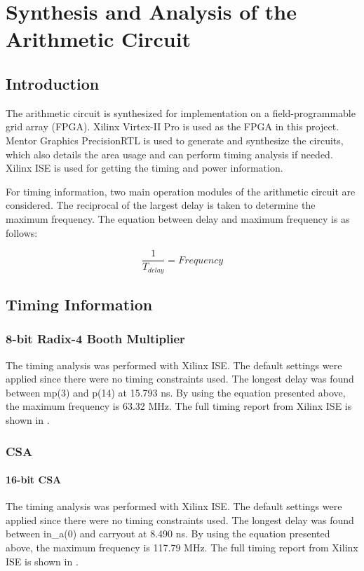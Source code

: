 \section{Synthesis and Analysis of the Arithmetic Circuit}

\subsection{Introduction}

The arithmetic circuit is synthesized for implementation on a field-programmable grid array (FPGA).
Xilinx Virtex-II Pro is used as the FPGA in this project.
Mentor Graphics PrecisionRTL is used to generate and synthesize the circuits,
which also details the area usage and can perform timing analysis if needed.
Xilinx ISE is used for getting the timing and power information.

For timing information, two main operation modules of the arithmetic circuit are considered.
The reciprocal of the largest delay is taken to determine the maximum frequency.
The equation between delay and maximum frequency is as follows:

\begin{equation}
	\frac{1}{T_{delay}} = Frequency
	\label{exp:dl}
\end{equation}


\subsection{Timing Information}
\subsubsection{8-bit Radix-4 Booth Multiplier}
The timing analysis was performed with Xilinx ISE.
The default settings were applied since there were no timing constraints used.
The longest delay was found between mp(3) and p(14) at 15.793 ns.
By using the equation presented above, the maximum frequency is 63.32 MHz.
The full timing report from Xilinx ISE is shown in .

\subsubsection{CSA}
\paragraph{16-bit CSA}
The timing analysis was performed with Xilinx ISE.
The default settings were applied since there were no timing constraints used.
The longest delay was found between in\_a(0) and carryout at 8.490 ns.
By using the equation presented above, the maximum frequency is 117.79 MHz.
The full timing report from Xilinx ISE is shown in .

